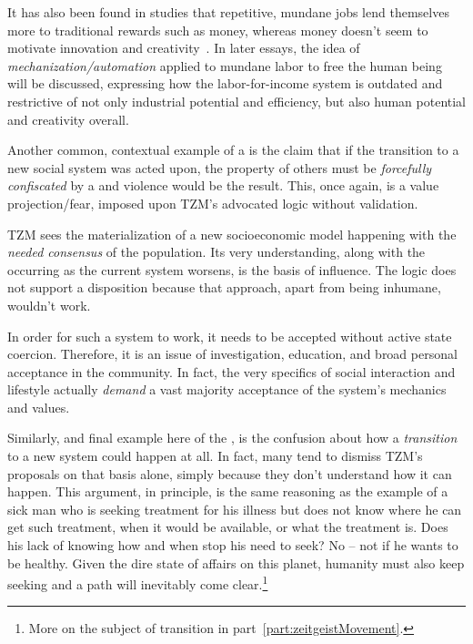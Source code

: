 \documentclass[10pt, a4paper, cleardoubleempty, openright, twoside]{book}
\begin{document}
It has also been found in studies that repetitive, mundane jobs lend
themselves more to traditional rewards such as money, whereas money
doesn't seem to motivate innovation and creativity~\cite{Pink::11}. In
later essays, the idea of \emph{mechanization/automation} applied to
mundane labor to free the human being will be discussed, expressing how
the labor-for-income system is outdated and restrictive of not only
industrial potential and efficiency, but also human potential and
creativity overall.

Another common, contextual example of a  is the
claim that if the transition to a new social system was acted upon, the
property of others must be \emph{forcefully confiscated} by a
 and violence would be the result. This, once
again, is a value projection/fear, imposed upon TZM's advocated logic
without validation.

TZM sees the materialization of a new socioeconomic model happening with
the \emph{needed consensus} of the population. Its very understanding,
along with the  occurring as the current
system worsens, is the basis of influence. The logic does not support a
 disposition because that approach, apart from
being inhumane, wouldn't work.

In order for such a system to work, it needs to be accepted without
active state coercion. Therefore, it is an issue of investigation,
education, and broad personal acceptance in the community. In fact, the
very specifics of social interaction and lifestyle actually \emph{demand
} a vast majority acceptance of the system's mechanics and values.

Similarly, and final example here of the , is the
confusion about how a \emph{transition} to a new system could happen at
all. In fact, many tend to dismiss TZM's proposals on that basis alone,
simply because they don't understand how it can happen. This argument,
in principle, is the same reasoning as the example of a sick man who is
seeking treatment for his illness but does not know where he can get
such treatment, when it would be available, or what the treatment is.
Does his lack of knowing how and when stop his need to seek? No -- not if
he wants to be healthy. Given the dire state of affairs on this planet,
humanity must also keep seeking and a path will inevitably come
clear.\footnote{
	More on the subject of transition in part~\ref{part:zeitgeistMovement}.
}
\end{document}
